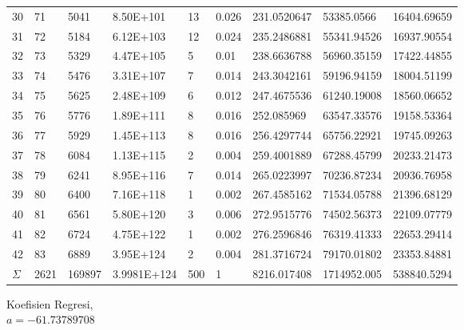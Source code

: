 \documentclass{article}
\begin{document}
\begin{longtable}{@{}lllllllll@{}}
				30  & 71   & 5041                 & 8.50E+101   & 13  & 0.026 & 231.0520647 & 53385.0566                  & 16404.69659 \\
				31  & 72   & 5184                 & 6.12E+103   & 12  & 0.024 & 235.2486881 & 55341.94526                 & 16937.90554 \\
				32  & 73   & 5329                 & 4.47E+105   & 5   & 0.01  & 238.6636788 & 56960.35159                 & 17422.44855 \\
				33  & 74   & 5476                 & 3.31E+107   & 7   & 0.014 & 243.3042161 & 59196.94159                 & 18004.51199 \\
				34  & 75   & 5625                 & 2.48E+109   & 6   & 0.012 & 247.4675536 & 61240.19008                 & 18560.06652 \\
				35  & 76   & 5776                 & 1.89E+111   & 8   & 0.016 & 252.085969  & 63547.33576                 & 19158.53364 \\
				36  & 77   & 5929                 & 1.45E+113   & 8   & 0.016 & 256.4297744 & 65756.22921                 & 19745.09263 \\
				37  & 78   & 6084                 & 1.13E+115   & 2   & 0.004 & 259.4001889 & 67288.45799                 & 20233.21473 \\
				38  & 79   & 6241                 & 8.95E+116   & 7   & 0.014 & 265.0223997 & 70236.87234                 & 20936.76958 \\
				39  & 80   & 6400                 & 7.16E+118   & 1   & 0.002 & 267.4585162 & 71534.05788                 & 21396.68129 \\
				40  & 81   & 6561                 & 5.80E+120   & 3   & 0.006 & 272.9515776 & 74502.56373                 & 22109.07779 \\
				41  & 82   & 6724                 & 4.75E+122   & 1   & 0.002 & 276.2596846 & 76319.41333                 & 22653.29414 \\
				42  & 83   & 6889                 & 3.95E+124   & 2   & 0.004 & 281.3716724 & 79170.01802                 & 23353.84881 \\* \midrule
				$\Sigma$ & 2621 & 169897               & 3.9981E+124 & 500 & 1     & 8216.017408 & 1714952.005                 & 538840.5294 \\* \bottomrule
			\end{longtable}
			\hspace{-0.6cm}Koefisien Regresi, \\
			$a = -61.73789708$ \\
\end{document}
